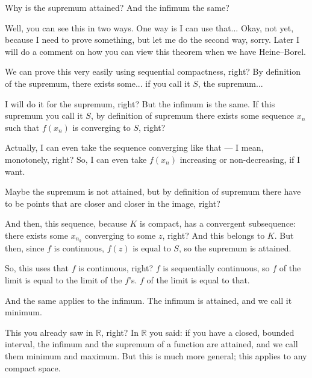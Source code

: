 \begin{speech}[00:37:43 - 00:39:13]
Why is the supremum attained? And the infimum the same?

Well, you can see this in two ways. One way is I can use that... Okay, not yet, because I need to prove something, but let me do the second way, sorry. Later I will do a comment on how you can view this theorem when we have Heine--Borel.

We can prove this very easily using sequential compactness, right? By definition of the supremum, there exists some... if you call it $S$, the supremum... 

I will do it for the supremum, right? But the infimum is the same. If this supremum you call it $S$,  by definition of supremum there exists some sequence  $x_n$ such that $f(x_n)$ is converging to $S$,  right?
\end{speech}

\begin{speech}[00:39:13 - 00:40:25]
Actually, I can even take the sequence converging like that --- I mean, monotonely, right? So, I can even take $f(x_n)$ increasing or non-decreasing,  if I want.

Maybe the supremum is not attained, but by definition of supremum there have to be points that are closer and closer in the image, right?

And then, this sequence, because $K$ is compact, has a convergent subsequence:  there exists some $x_{n_k}$ converging to some $z$, right? And this belongs to $K$. But then, since $f$ is continuous, $f(z)$ is equal to $S$,  so the supremum is attained.

So, this uses that $f$ is continuous,  right? $f$ is sequentially continuous, so $f$ of the limit is equal to the limit of the $f$'s. $f$ of the limit is equal to that.
\end{speech}

\begin{speech}[00:40:25 - 00:41:13]
And the same applies to the infimum. The infimum is attained, and we call it minimum.

This you already saw in $\mathbb{R}$, right? In $\mathbb{R}$ you said: if you have a closed, bounded interval, the infimum and the supremum of a function are attained, and we call them minimum and maximum. But this is much more general; this applies to any compact space.
\end{speech}

